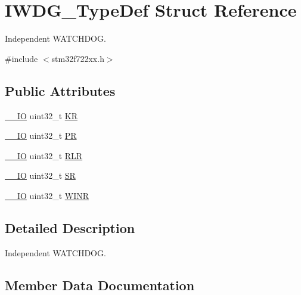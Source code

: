 \hypertarget{struct_i_w_d_g___type_def}{}\section{I\+W\+D\+G\+\_\+\+Type\+Def Struct Reference}
\label{struct_i_w_d_g___type_def}


Independent W\+A\+T\+C\+H\+D\+OG.  




{\ttfamily \#include $<$stm32f722xx.\+h$>$}

\subsection*{Public Attributes}
\begin{DoxyCompactItemize}
\item 
\mbox{\hyperlink{core__sc300_8h_aec43007d9998a0a0e01faede4133d6be}{\+\_\+\+\_\+\+IO}} uint32\+\_\+t \mbox{\hyperlink{struct_i_w_d_g___type_def_a63089aaa5f4ad34ee2677ebcdee49cd9}{KR}}
\item 
\mbox{\hyperlink{core__sc300_8h_aec43007d9998a0a0e01faede4133d6be}{\+\_\+\+\_\+\+IO}} uint32\+\_\+t \mbox{\hyperlink{struct_i_w_d_g___type_def_a5f2717885ff171e686e0347af9e6b68d}{PR}}
\item 
\mbox{\hyperlink{core__sc300_8h_aec43007d9998a0a0e01faede4133d6be}{\+\_\+\+\_\+\+IO}} uint32\+\_\+t \mbox{\hyperlink{struct_i_w_d_g___type_def_aa3703eaa40e447dcacc69c0827595532}{R\+LR}}
\item 
\mbox{\hyperlink{core__sc300_8h_aec43007d9998a0a0e01faede4133d6be}{\+\_\+\+\_\+\+IO}} uint32\+\_\+t \mbox{\hyperlink{struct_i_w_d_g___type_def_a9bbfbe921f2acfaf58251849bd0a511c}{SR}}
\item 
\mbox{\hyperlink{core__sc300_8h_aec43007d9998a0a0e01faede4133d6be}{\+\_\+\+\_\+\+IO}} uint32\+\_\+t \mbox{\hyperlink{struct_i_w_d_g___type_def_a88aff7f1de0043ecf1667bd40b8c99d1}{W\+I\+NR}}
\end{DoxyCompactItemize}


\subsection{Detailed Description}
Independent W\+A\+T\+C\+H\+D\+OG. 

\subsection{Member Data Documentation}
\mbox{\label{struct_i_w_d_g___type_def_a63089aaa5f4ad34ee2677ebcdee49cd9}} 
